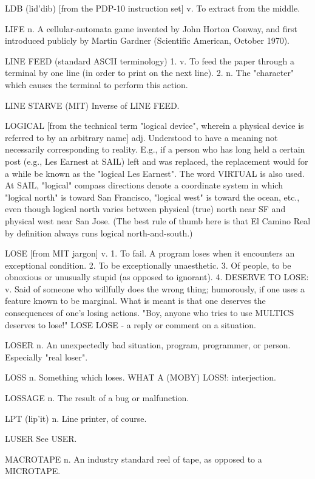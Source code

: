 LDB (lid'dib) [from the PDP-10 instruction set] v. To extract from the
   middle.

LIFE n. A cellular-automata game invented by John Horton Conway, and
   first introduced publicly by Martin Gardner (Scientific American,
   October 1970).

LINE FEED (standard ASCII terminology) 1. v. To feed the paper through
   a terminal by one line (in order to print on the next line).	 2. n.
   The "character" which causes the terminal to perform this action.

LINE STARVE (MIT) Inverse of LINE FEED.

LOGICAL [from the technical term "logical device", wherein a physical
   device is referred to by an arbitrary name] adj. Understood to have
   a meaning not necessarily corresponding to reality.	E.g., if a
   person who has long held a certain post (e.g., Les Earnest at SAIL)
   left and was replaced, the replacement would for a while be known
   as the "logical Les Earnest".  The word VIRTUAL is also used.  At
   SAIL, "logical" compass directions denote a coordinate system in
   which "logical north" is toward San Francisco, "logical west" is
   toward the ocean, etc., even though logical north varies between
   physical (true) north near SF and physical west near San Jose.
   (The best rule of thumb here is that El Camino Real by definition
   always runs logical north-and-south.)

LOSE [from MIT jargon] v. 1. To fail.  A program loses when it
   encounters an exceptional condition.	 2. To be exceptionally
   unaesthetic.	 3. Of people, to be obnoxious or unusually stupid (as
   opposed to ignorant).  4. DESERVE TO LOSE: v. Said of someone who
   willfully does the wrong thing; humorously, if one uses a feature
   known to be marginal.  What is meant is that one deserves the
   consequences of one's losing actions.  "Boy, anyone who tries to
   use MULTICS deserves to lose!"
   LOSE LOSE - a reply or comment on a situation.

LOSER n. An unexpectedly bad situation, program, programmer, or
   person.  Especially "real loser".

LOSS n. Something which loses.	WHAT A (MOBY) LOSS!: interjection.

LOSSAGE n. The result of a bug or malfunction.

LPT (lip'it) n. Line printer, of course.

LUSER  See USER.

MACROTAPE n. An industry standard reel of tape, as opposed to a
   MICROTAPE.

